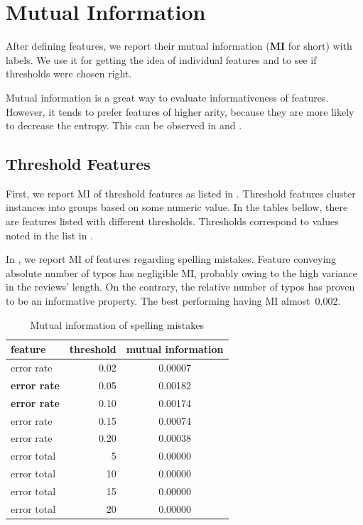 \section{Mutual Information}\label{sec:mi}

After defining features, we report their mutual information (\textbf{MI} for short) with labels.
We use it for getting the idea of individual features and
to see if thresholds were chosen right.

Mutual information is a great way to evaluate informativeness of features.
However, it tends to prefer features of higher arity, because
they are more likely to decrease the entropy.
This can be observed in  and .


\subsection{Threshold Features}

First, we report MI of threshold features as listed in .
Threshold features cluster instances into groups based on some numeric value.
In the tables bellow, there are features listed with different thresholds.
Thresholds correspond to values noted in the list in .


In , we report MI of features regarding spelling mistakes.
Feature conveying absolute number of typos has negligible MI, probably owing to the high variance in the reviews' length.
On the contrary, the relative number of typos has proven to be an informative property.
The best performing having MI almost~0.002.

\begin{table}[h!]

\centering
\begin{tabular}{lrS[table-format=3.2]}
\toprule
\textbf{feature} & \textbf{threshold} & \textbf{mutual information} \\
\midrule
error rate & 0.02 & 0.00007 \\
\textbf{error rate} & 0.05 & 0.00182 \\
\textbf{error rate} & 0.10 & 0.00174 \\
error rate & 0.15 & 0.00074 \\
error rate & 0.20 & 0.00038 \\
\midrule
error total & 5 & 0.00000 \\
error total & 10 & 0.00000 \\
error total & 15 & 0.00000 \\
error total & 20 & 0.00000 \\
\bottomrule
\end{tabular}

\caption{Mutual information of spelling mistakes}\label{tab:mi_errors}
\end{table}


